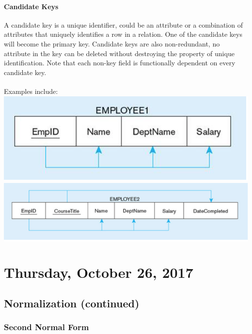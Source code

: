 \documentclass[12pt]{article}
\begin{document}
\paragraph{Candidate Keys} A candidate key is a unique identifier, could be an attribute or a combination of attributes that uniquely identifies a row in a relation. One of the candidate keys will become the primary key. Candidate keys are also non-redundant, no attribute in the key can be deleted without destroying the property of unique identification. Note that each non-key field is functionally dependent on every candidate key.\\
\\
Examples include:\\
\includegraphics[scale=0.8]{lec5-4}\\
\includegraphics[scale=0.5]{lec5-5}

\newpage

\section{Thursday, October 26, 2017}

\subsection{Normalization (continued)}

\subsubsection{Second Normal Form}
\end{document}
